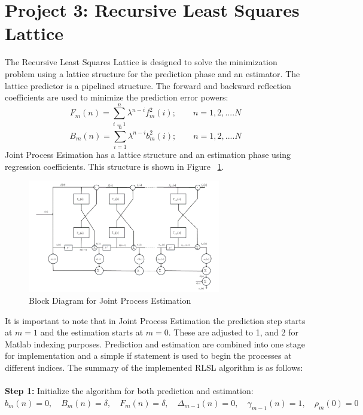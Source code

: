 \documentclass[journal]{IEEEtran}
\begin{document}
\section{Project 3: Recursive Least Squares Lattice}
The Recursive Least Squares Lattice is designed to solve the minimization problem
using a lattice structure for the prediction phase and an estimator. The lattice predictor
is a pipelined structure. The forward and backward reflection coefficients are used to minimize
the prediction error powers:
\begin{equation}
F_m(n)=\sum_{i=1}^{n}\lambda^{n-i}f^2_m(i); \qquad n = 1,2,....N
\end{equation}
\begin{equation}
B_m(n)=\sum_{i=1}^{n}\lambda^{n-i}b^2_m(i); \qquad n = 1,2,....N
\end{equation}
Joint Process Esimation has a lattice structure and an estimation phase using regression coefficients. This structure is
shown in Figure ~\ref{fig:jointprocess}.
\begin{figure}
  \centering
  \captionsetup{justification=centering,font = small}
  \includegraphics[width=0.75\textwidth] {Plots/jointprocess}
  \caption{Block Diagram for Joint Process Estimation \cite{lecturenotes}}
    \label{fig:jointprocess}
\end{figure}
It is important to note that in Joint Process Estimation the prediction step starts at $ m = 1 $ and the estimation starts
at $m = 0$. These are adjusted to 1, and 2 for Matlab indexing purposes. Prediction and estimation are combined into one stage for implementation
and a simple if statement is used to begin the processes at different indices.
The summary of the implemented RLSL algorithm is as follows:\\
\\
\textbf{Step 1:} Initialize the algorithm for both prediction and estimation:
$b_m(n) = 0, \quad B_m(n) = \delta, \quad F_m(n) = \delta, \quad \Delta_{m-1}(n) = 0, \quad \gamma_{m-1}(n) = 1,\quad \rho_{m}(0) = 0$\\
\end{document}
